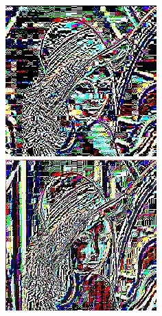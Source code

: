 \documentclass[a4paper,12pt]{article}
\begin{document}
\begin{figure}[h]
    \centering
\begin{minipage}[h]{.45\linewidth}
\centering
\includegraphics[width=0.55\linewidth]{preconditioning/lena_up}
\end{minipage}
\hfill
\begin{minipage}[h]{0.45\linewidth}
\centering
\includegraphics[width=0.55\linewidth]{preconditioning/lena_av2}
\end{minipage}
\end{figure}
\end{document}
